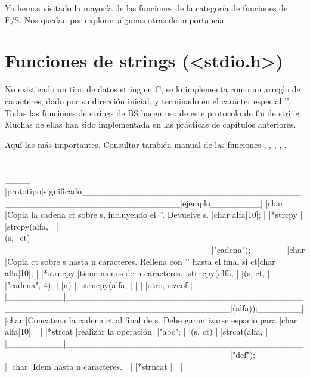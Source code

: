 Ya hemos visitado la mayoría de las funciones de la categoría de funciones de E/S. Nos
quedan por explorar algunas otras de importancia.

\section{Funciones de strings (<stdio.h>)}
No existiendo un tipo de datos string en C, se lo implementa como un arreglo de
caracteres, dado por su dirección inicial, y terminado en el carácter especial
'\0'. Todas las funciones de strings de BS hacen uso de este protocolo de fin
de string. Muchas de ellas han sido implementada en las prácticas de capítulos
anteriores.

Aquí las más importantes. Consultar también manual de las funciones ,
, , , .
 ____________________________________________________________________________________________________
|prototipo|significado_______________________________________________________________|ejemplo________|
|char     |Copia la cadena ct sobre s, incluyendo el '\0'. Devuelve s.               |char alfa[10]; |
|*strcpy  |                                                                          |strcpy(alfa,   |
|(s,_ct)__|__________________________________________________________________________|"cadena");_____|
|char     |Copia ct sobre s hasta n caracteres. Rellena con '\0' hasta el final si ct|char alfa[10]; |
|*strncpy |tiene menos de n caracteres.                                              |strncpy(alfa,  |
|(s, ct,  |                                                                          |"cadena", 4);  |
|n)       |                                                                          |strncpy(alfa,  |
|         |                                                                          |otro, sizeof   |
|_________|__________________________________________________________________________|(alfa));_______|
|char     |Concatena la cadena ct al final de s. Debe garantizarse espacio para      |char alfa[10] =|
|*strcat  |realizar la operación.                                                   |"abc";         |
|(s, ct)  |                                                                          |strcat(alfa,   |
|_________|__________________________________________________________________________|"def");________|
|char     |Idem hasta n caracteres.                                                  |               |
|*strncat |                                                                          |               |

